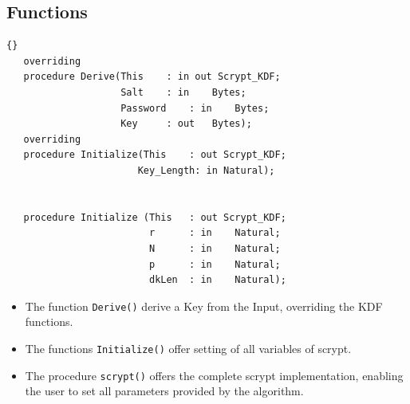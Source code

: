 \subsection*{Functions}
\begin{lstlisting}{}
   overriding
   procedure Derive(This	: in out Scrypt_KDF;
                    Salt	: in 	Bytes;
                    Password	: in	Bytes;
                    Key		: out	Bytes);
   overriding
   procedure Initialize(This	: out Scrypt_KDF;
                       Key_Length: in Natural);


   procedure Initialize (This	: out Scrypt_KDF;
                         r		: in 	Natural;
                         N		: in 	Natural;
                         p		: in	Natural;
                         dkLen	: in	Natural);

\end{lstlisting}
\begin{itemize}
	\item The function \texttt{Derive()} derive a Key from the Input, overriding the KDF functions.
	\item The functions \texttt{Initialize()} offer setting of all variables of scrypt.
	\item The procedure \texttt{scrypt()} offers the complete scrypt implementation, enabling the user to set all parameters provided by the algorithm.
\end{itemize}

